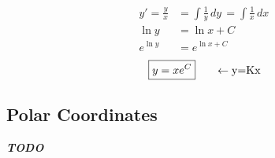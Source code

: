\documentclass[a4paper]{article}
\begin{document}
\begin{align}
y'=\frac{y}{x}&=\int \frac{1}{y} \, dy\, =\int \frac{1}{x} \, dx\,  \\
\ln y&=\ln x+C \\
e^{ \ln y }&=e^{ \ln x+C }
\end{align}
$$
\boxed{y=xe^{ C }}\hspace{4ex}\leftarrow\text{y=Kx}
$$

\subsection{Polar Coordinates}
\textit{\textbf{TODO}}
\end{document}

